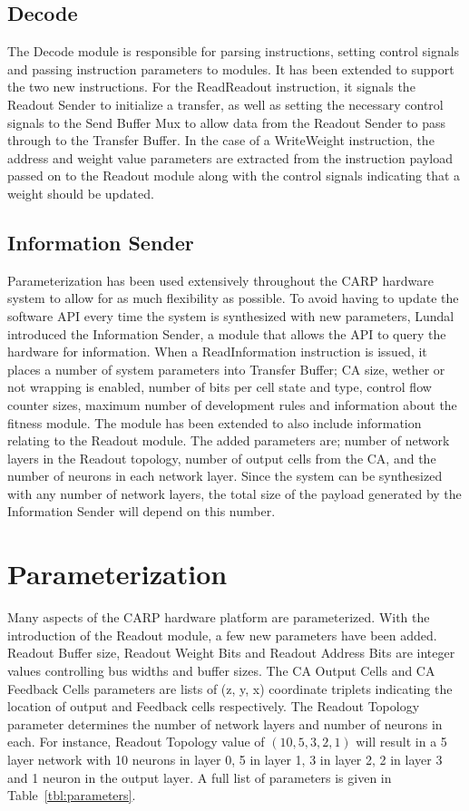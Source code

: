\subsection{Decode}

The Decode module is responsible for parsing instructions, setting control
signals and passing instruction parameters to modules. It has been extended to
support the two new instructions. For the ReadReadout instruction, it signals the
Readout Sender to initialize a transfer, as well as setting the necessary
control signals to the Send Buffer Mux to allow data from the Readout Sender to
pass through to the Transfer Buffer. In the case of a WriteWeight instruction,
the address and weight value parameters are extracted from the instruction
payload passed on to the Readout module along with the control signals
indicating that a weight should be updated.

\subsection{Information Sender}

Parameterization has been used extensively throughout the CARP hardware system
to allow for as much flexibility as possible. To avoid having to update the
software API every time the system is synthesized with new parameters, Lundal
introduced the Information Sender, a module that allows the API to query the
hardware for information. When a ReadInformation instruction is issued, it
places a number of system parameters into Transfer Buffer; CA size, wether or
not wrapping is enabled, number of bits per cell state and type, control flow
counter sizes, maximum number of development rules and information about the
fitness module. The module has been extended to also include information
relating to the Readout module. The added parameters are; number of network
layers in the Readout topology, number of output cells from the CA, and the
number of neurons in each network layer. Since the system can be synthesized
with any number of network layers, the total size of the payload generated by
the Information Sender will depend on this number.

\section{Parameterization}
\label{sec:parameterization}

Many aspects of the CARP hardware platform are parameterized. With the
introduction of the Readout module, a few new parameters have been added.
Readout Buffer size, Readout Weight Bits and Readout Address Bits are integer
values controlling bus widths and buffer sizes. The CA Output Cells and CA
Feedback Cells parameters are lists of (z, y, x) coordinate triplets indicating
the location of output and Feedback cells respectively. The Readout Topology
parameter determines the number of network layers and number of neurons in each.
For instance, Readout Topology value of $(10, 5, 3, 2, 1)$ will result in a 5
layer network with 10 neurons in layer 0, 5 in layer 1, 3 in layer 2, 2 in layer
3 and 1 neuron in the output layer. A full list of parameters is given in
Table~\ref{tbl:parameters}.

